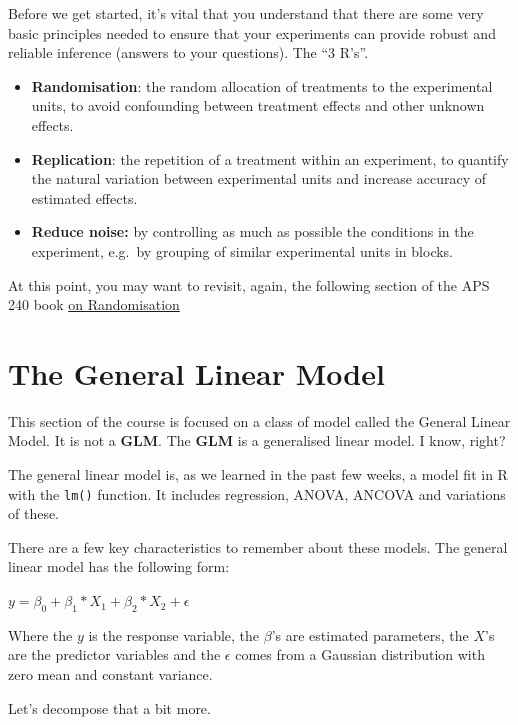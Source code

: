 \documentclass[
]{book}
\providecommand{\tightlist}{%
  \setlength{\itemsep}{0pt}\setlength{\parskip}{0pt}}
\begin{document}
Before we get started, it's vital that you understand that there are some very basic principles needed to ensure that your experiments can provide robust and reliable inference (answers to your questions). The ``3 R's''.

\begin{itemize}
\tightlist
\item
  \textbf{Randomisation}: the random allocation of treatments to the experimental units, to avoid confounding between treatment effects and other unknown effects.
\item
  \textbf{Replication}: the repetition of a treatment within an experiment, to quantify the natural variation between experimental units and increase accuracy of estimated effects.
\item
  \textbf{Reduce noise:} by controlling as much as possible the conditions in the experiment, e.g.~by grouping of similar experimental units in blocks.
\end{itemize}

At this point, you may want to revisit, again, the following section of the APS 240 book \href{https://dzchilds.github.io/stats-for-bio/principles-experimental-design.html\#randomisation}{on Randomisation}

\hypertarget{the-general-linear-model}{%
\section{The General Linear Model}\label{the-general-linear-model}}

This section of the course is focused on a class of model called the General Linear Model. It is not a \textbf{GLM}. The \textbf{GLM} is a generalised linear model. I know, right?

The general linear model is, as we learned in the past few weeks, a model fit in R with the \texttt{lm()} function. It includes regression, ANOVA, ANCOVA and variations of these.

There are a few key characteristics to remember about these models. The general linear model has the following form:

\(y = \beta_{0}+\beta_{1}*X_{1}+\beta_{2}*X_{2}+\epsilon\)

Where the \(y\) is the response variable, the \(\beta\)'s are estimated parameters, the \(X\)'s are the predictor variables and the \(\epsilon\) comes from a Gaussian distribution with zero mean and constant variance.

Let's decompose that a bit more.
\end{document}
